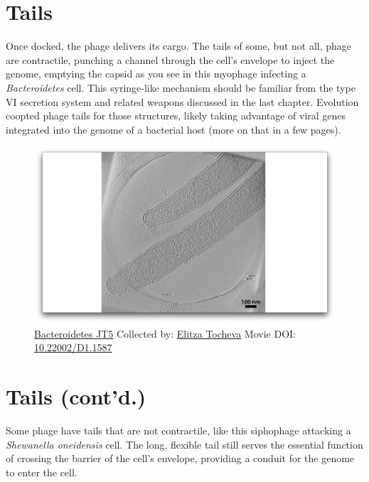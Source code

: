 \documentclass[]{tufte-book}
\begin{document}
\section{Tails}\label{tails}

Once docked, the phage delivers its cargo. The tails of some, but not
all, phage are contractile, punching a channel through the cell's
envelope to inject the genome, emptying the capsid as you see in this
myophage infecting a \emph{Bacteroidetes} cell. This syringe-like
mechanism should be familiar from the type VI secretion system and
related weapons discussed in the last chapter. Evolution coopted phage
tails for those structures, likely taking advantage of viral genes
integrated into the genome of a bacterial host (more on that in a few
pages).





\begin{figure}
\includegraphics{movie_stills/10_2} \caption[\protect\hyperlink{tree}{Bacteroidetes JT5} Collected by:
\protect\hyperlink{elitza_tocheva}{Elitza Tocheva} Movie DOI:
\href{https://doi.org/10.22002/D1.1587}{10.22002/D1.1587}]{\protect\hyperlink{tree}{Bacteroidetes JT5} Collected by:
\protect\hyperlink{elitza_tocheva}{Elitza Tocheva} Movie DOI:
\href{https://doi.org/10.22002/D1.1587}{10.22002/D1.1587}}\label{fig:10-2}
\end{figure}

\section{Tails (cont'd.)}\label{tails-contd.}

Some phage have tails that are not contractile, like this siphophage
attacking a \emph{Shewanella oneidensis} cell. The long, flexible tail
still serves the essential function of crossing the barrier of the
cell's envelope, providing a conduit for the genome to enter the cell.
\end{document}
